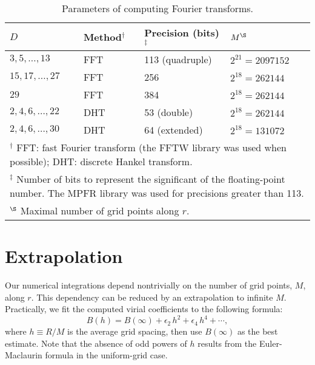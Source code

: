 \documentclass[aip,jcp,preprint,superscriptaddress,showpacs,preprintnumbers,amsmath,amssymb]{revtex4-1}
\numberwithin{equation}{section}
\begin{document}
\begin{table}
\begin{tabular}{ l l l l }
\hline
$D$
&
Method$^\dagger$
&
Precision (bits)$^\ddagger$
&
$M^\S$
\\ \hline
%
$3, 5, \dots, 13$
&
FFT
&
113 (quadruple)
&
$2^{21} = 2097152$
\\
%
$15, 17, \dots, 27$
&
FFT
&
256
&
$2^{18} = 262144$
\\
%
$29$
&
FFT
&
384
&
$2^{18} = 262144$
\\ \hline
%
$2, 4, 6, \dots, 22$
&
DHT
&
53 (double)
&
$2^{18} = 262144$
\\
%
$2, 4, 6, \dots, 30$
&
DHT
&
64 (extended)
&
$2^{18} = 131072$
\\ \hline
\multicolumn{4}{p{\linewidth}}{
$^\dagger$
FFT: fast Fourier transform\cite{press}
(the FFTW\cite{frigo2005} library was used when possible);
DHT: discrete Hankel transform\cite{
johnson1987, *lemoine1994}.
} \\
\multicolumn{4}{p{\linewidth}}{
$^\ddagger$
Number of bits to represent the significant of
the floating-point number.
The MPFR library\cite{fousse2007}
was used for precisions greater than 113.
} \\
\multicolumn{4}{p{\linewidth}}{
$^\S$
Maximal number of grid points along $r$.
} \\ \hline
%
\end{tabular}
\caption{
Parameters of computing Fourier transforms.
}
\label{tab:paramft}
\end{table}





\section{Extrapolation}





Our numerical integrations depend nontrivially
on the number of grid points, $M$, along $r$.
%
This dependency can be reduced
by an extrapolation to infinite $M$\cite{
adda-bedia2008a, *adda-bedia2008b}.
%
Practically, we fit the computed virial coefficients
to the following formula:
%
%
%
\begin{equation}
B(h)
=
B(\infty)
+
\epsilon_2 \, h^2
+
\epsilon_4 \, h^4
+
\cdots,
\label{eq:error_series}
\end{equation}
%
%
%
where $h \equiv R/M$
is the average grid spacing,
then use $B(\infty)$ as the best estimate.
%
Note that the absence of odd powers of $h$
results from the Euler-Maclaurin formula\cite{
arfken, whittaker}
in the uniform-grid case.
\end{document}
